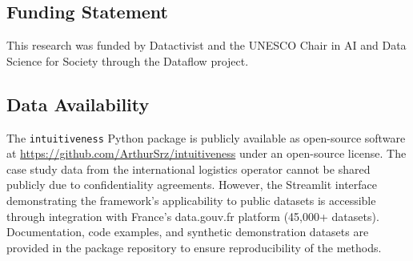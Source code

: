 \documentclass[12pt,a4paper]{article}
\begin{document}
\subsection*{Funding Statement}
This research was funded by Datactivist and the UNESCO Chair in AI and Data Science for Society through the Dataflow project.

\subsection*{Data Availability}
The \texttt{intuitiveness} Python package is publicly available as open-source software at \url{https://github.com/ArthurSrz/intuitiveness} under an open-source license. The case study data from the international logistics operator cannot be shared publicly due to confidentiality agreements. However, the Streamlit interface demonstrating the framework's applicability to public datasets is accessible through integration with France's data.gouv.fr platform (45,000+ datasets). Documentation, code examples, and synthetic demonstration datasets are provided in the package repository to ensure reproducibility of the methods.
\end{document}
